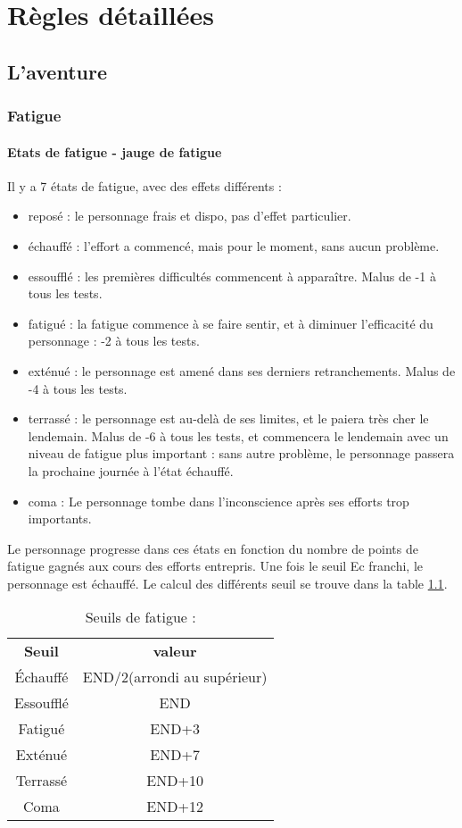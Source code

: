 \documentclass[10pt,a4paper,twocolumn]{book}
\begin{document}
\part{Règles détaillées}

\chapter{L'aventure}
\section{Fatigue}
\subsection*{Etats de fatigue - jauge de fatigue}
Il y  a 7 états de fatigue, avec des effets différents :

\begin{itemize}

\item{reposé} : le personnage frais et dispo, pas d’effet particulier.
\item{échauffé} : l’effort a commencé, mais pour le moment, sans aucun problème.
\item{essoufflé} : les premières difficultés commencent à apparaître. Malus de -1 à tous les tests.
\item{fatigué} : la fatigue commence à se faire sentir, et à diminuer l’efficacité du personnage : -2 à tous les tests.
\item{exténué} : le personnage est amené dans ses derniers retranchements. Malus de -4 à tous les tests.
\item{terrassé} : le personnage est au-delà de ses limites, et le paiera très cher le lendemain. Malus de -6 à tous les tests, et commencera le lendemain avec un niveau de fatigue plus important : sans autre problème, le personnage passera la prochaine journée à l’état échauffé.
\item{coma} : Le personnage tombe dans l’inconscience après ses efforts trop importants.
\end{itemize}
Le personnage progresse dans ces états en fonction du nombre de points de fatigue gagnés aux cours des efforts entrepris.
Une fois le seuil Ec franchi, le personnage est échauffé. 
Le calcul des différents seuil se trouve dans la table \ref{tableSeuilsFatigue}.

\begin{table}
\caption{ Seuils de fatigue :}
\label{tableSeuilsFatigue}
\begin{center}
\begin{tabular}{cc}
\textbf{Seuil} & \textbf{valeur} \\
   Échauffé & END/2(arrondi au supérieur)  \\
   Essoufflé & END  \\
   Fatigué & END+3 \\
   Exténué & END+7 \\
   Terrassé & END+10 \\
   Coma & END+12 \\
\end{tabular}
\end{center}
\end{table}
\end{document}
